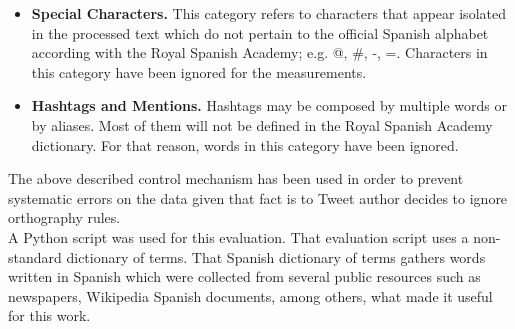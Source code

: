 \documentclass[9pt,conference]{IEEEtran}
\begin{document}
\begin{itemize}
\item \textbf{Special Characters.}
This category refers to characters that appear isolated in the processed text which do not 
pertain to the official Spanish alphabet according with the Royal Spanish Academy\cite{ref:41}; e.g. 
@, \#, -, =. Characters in this category have been ignored for the measurements.\\

\item \textbf{Hashtags and Mentions.}
Hashtags may be composed by multiple words or by aliases. Most of them will not be
defined in the Royal Spanish Academy dictionary. For that reason, words in this category 
have been ignored.\\
\end{itemize}
 
The above described control mechanism has been used in order to prevent systematic 
errors on the data given that fact is to Tweet author decides to ignore orthography rules.\\

A Python script was used for this evaluation. That evaluation script uses a non-standard 
dictionary of terms. That Spanish dictionary of terms gathers words written in Spanish
which were collected from several public resources such as newspapers, Wikipedia
Spanish documents, among others, what made it useful for this work.\\
\end{document}
